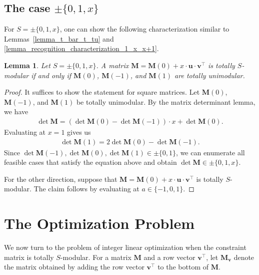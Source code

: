 \documentclass[a4paper, 11pt]{article}
\newcommand{\bv}{\bm{v}}
\newcommand{\bu}{\bm{u}}
\newcommand{\bM}{\bm{M}}
\newcommand{\indet}{x}
\newcommand{\intvar}{a}
\newcommand{\polyS}{S}
\newcommand{\polyM}{\bM}
\newtheorem{lemma}{Lemma}
\begin{document}
	\subsection{The case $\pm\lbrace 0,1,\indet\rbrace$}
	For $\polyS = \pm \lbrace 0,1,\indet\rbrace$, 
	one can show the following characterization similar to Lemmas~\ref{lemma_t_bar_t_tu} and \ref{lemma_recognition_characterization_1_x_x+1}.
	\begin{lemma}
		\label{lemma_recognition_characterization_0_1_x}
		Let $\polyS = \pm\lbrace 0,1,\indet\rbrace$. A matrix $\polyM = \bM(0) + \indet \cdot\bu\cdot\bv^\top$ is totally $\polyS$-modular if and only if $\bM(0)$, $\bM(-1)$, and $\bM(1)$ are totally unimodular.
	\end{lemma}
	\begin{proof}
		It suffices to show the statement for square matrices. Let $\bM(0)$, $\bM(-1)$, and $\bM(1)$ be totally unimodular. By the matrix determinant lemma, we have 
		\begin{align*}
			\det\bM = (\det\bM(0) - \det\bM(-1))\cdot\indet + \det\bM(0).
		\end{align*}
		Evaluating at $\indet = 1$ gives us
		\begin{align*}
			\det\bM(1) = 2\det\bM(0) - \det\bM(-1).
		\end{align*}
		Since $\det\bM(-1),\det\bM(0),\det\bM(1)\in\pm\lbrace 0,1\rbrace$, we can enumerate all feasible cases that satisfy the equation above and obtain $\det\polyM\in\pm\lbrace 0,1,\indet\rbrace$.
		
		For the other direction, suppose that $\polyM = \bM(0) + \indet \cdot\bu\cdot\bv^\top$ is totally $\polyS$-modular. The claim follows by evaluating at $\intvar\in\lbrace -1,0,1\rbrace$.
	\end{proof}
	
	\section{The Optimization Problem}
	\label{sec_optimization}
		We now turn to the problem of integer linear optimization when the constraint matrix is totally $\polyS$-modular. For a matrix $\bM$ and a row vector $\bv^\top$, let $\bM_{\bv}$ denote the matrix obtained by adding the row vector $\bv^\top$ to the bottom of $\bM$.
	
\end{document}
